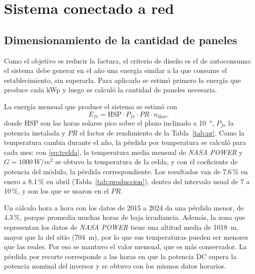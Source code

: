 \section{Sistema conectado a red}\label{sec:red}

\subsection{Dimensionamiento de la cantidad de paneles}

Como el objetivo es reducir la factura, el criterio de diseño es el de autoconsumo: el sistema debe generar en el año una energía similar a la que consume el establecimiento, sin superarla. Para aplicarlo se estimó primero la energía que produce cada kWp y luego se calculó la cantidad de paneles necesaria.

La energía mensual que produce el sistema se estimó con
\begin{equation}
E_{fv} = \mathrm{HSP}\cdot P_{fv}\cdot PR\cdot n_{\text{días}},
\label{eq:efv}
\end{equation}
donde HSP son las horas solares pico sobre el plano inclinado a \SI{10}{\degree}, $P_{fv}$ la potencia instalada y $PR$ el factor de rendimiento de la Tabla~\ref{tab:pr}. Como la temperatura cambia durante el año, la pérdida por temperatura se calculó para cada mes: con \eqref{eq:tcelda}, la temperatura media mensual de \textit{NASA POWER} \cite{nasa_power} y $G=\SI{1000}{W/m^2}$ se obtuvo la temperatura de la celda, y con el coeficiente de potencia del módulo, la pérdida correspondiente. Los resultados van de 7.6\,\% en enero a 8.1\,\% en abril (Tabla~\ref{tab:produccion}), dentro del intervalo usual de 7 a 10\,\%, y son los que se usaron en el $PR$.

Un cálculo hora a hora con los datos de 2015 a 2024 \cite{nasa_power_horario} da una pérdida menor, de 4.3\,\%, porque promedia muchas horas de baja irradiancia. Además, la zona que representan los datos de \textit{NASA POWER} tiene una altitud media de \SI{1018}{m}, mayor que la del sitio (\SI{704}{m}), por lo que sus temperaturas pueden ser menores que las reales. Por eso se mantuvo el valor mensual, que es más conservador. La pérdida por recorte corresponde a las horas en que la potencia DC supera la potencia nominal del inversor y se obtuvo con los mismos datos horarios.

